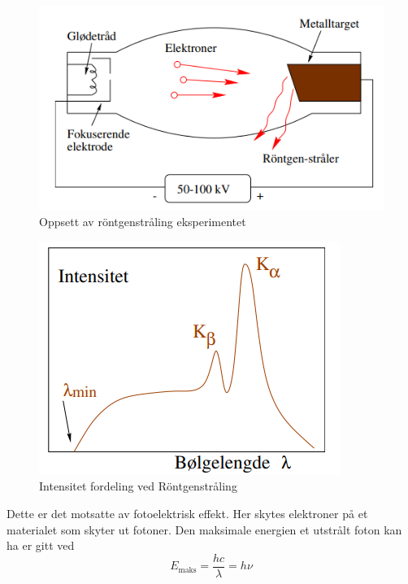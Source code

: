 \begin{figure}[h!]
    \centering
    \includegraphics[scale = .5]{Figures/Rontgenstraaling oppsett.png}
    \caption{Oppsett av röntgenstråling eksperimentet}
    \label{fig: Rontgenstraaling oppsett}
\end{figure}

\begin{figure}[h!]
  \centering
  \includegraphics[scale = .5]{Figures/Rontgenstraaling intensitetfordeling.png}
  \caption{Intensitet fordeling ved Röntgenstråling}
  \label{fig: Intensitets fordeling Rontgenstraaling}
\end{figure}

Dette er det motsatte av fotoelektrisk effekt. Her skytes elektroner på et materialet som skyter ut fotoner. Den maksimale energien et utstrålt foton kan ha er gitt ved 
\[
E_{\text{maks}} = \frac{hc}{\lambda} = hν
\]

  